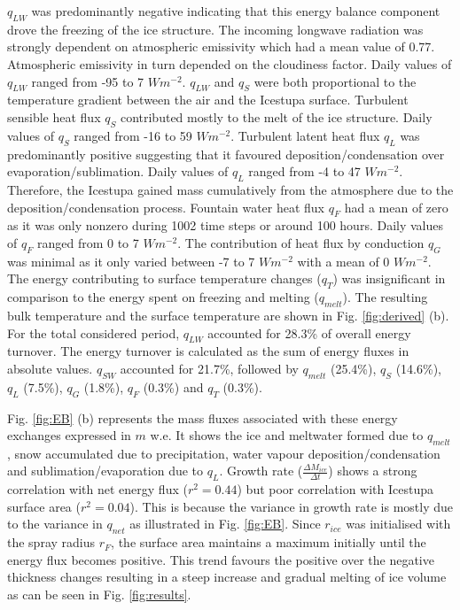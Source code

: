 \documentclass[utf8]{frontiersSCNS} %
\begin{document}
$q_{LW}$ was predominantly negative indicating that this energy balance component drove the freezing of the ice
structure. The incoming longwave radiation was strongly dependent on atmospheric emissivity which had a mean value of
0.77. Atmospheric emissivity in turn depended on the cloudiness factor. Daily values of $q_{LW}$ ranged from -95 to 7
$Wm^{-2}$.  $q_{LW}$ and $q_{S}$ were both proportional to the temperature gradient between the air and the Icestupa
surface. Turbulent sensible heat flux $q_{S}$ contributed mostly to the melt of the ice structure. Daily values of
$q_{S}$ ranged from -16 to 59 $Wm^{-2}$. Turbulent latent heat flux $q_{L}$ was predominantly positive suggesting that
it favoured deposition/condensation over evaporation/sublimation. Daily values of $q_{L}$ ranged from -4 to 47
$Wm^{-2}$. Therefore, the Icestupa gained mass cumulatively from the atmosphere due to the deposition/condensation
process. Fountain water heat flux $q_{F}$ had a mean of zero as it was only nonzero during 1002 time steps or around
100 hours. Daily values of $q_{F}$ ranged from 0 to 7 $Wm^{-2}$. The contribution of heat flux by conduction $q_{G}$
was minimal as it only varied between -7 to 7 $Wm^{-2}$ with a mean of 0 $Wm^{-2}$. The energy contributing to surface
temperature changes ($q_{T}$) was insignificant in comparison to the energy spent on freezing and melting
($q_{melt}$).  The resulting bulk temperature and the surface temperature are shown in Fig. \ref{fig:derived} (b).
For the total considered period, $q_{LW}$ accounted for 28.3\% of overall energy turnover. The energy turnover is
calculated as the sum of energy fluxes in absolute values. $q_{SW}$ accounted for 21.7\%, followed by $q_{melt}$
(25.4\%), $q_{S}$ (14.6\%), $q_{L}$ (7.5\%), $q_{G}$ (1.8\%), $q_{F}$ (0.3\%) and $q_{T}$ (0.3\%).

Fig. \ref{fig:EB} (b) represents the mass fluxes associated with these energy exchanges expressed in $m$ w.e. It shows
the ice and meltwater formed due to $q_{melt}$, snow accumulated due to precipitation, water vapour
deposition/condensation and sublimation/evaporation due to $q_L$. Growth rate ($\frac{\Delta M_{ice}}{\Delta t}$)
shows a strong correlation with net energy flux ($r^2 = 0.44$) but poor correlation with Icestupa surface area ($r^2 =
0.04$).  This is because the variance in growth rate is mostly due to the variance in $q_{net}$ as illustrated in Fig.
\ref{fig:EB}. Since $r_{ice}$ was initialised with the spray radius $r_F$, the surface area maintains a maximum
initially until the energy flux becomes positive. This trend favours the positive over the negative thickness changes
resulting in a steep increase and gradual melting of ice volume as can be seen in Fig. \ref{fig:results}.
\end{document}
